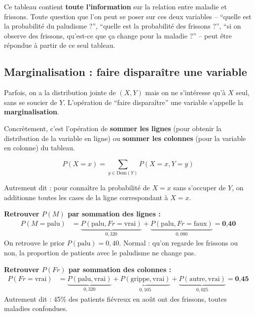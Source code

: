 \documentclass[11pt,a4paper]{article}
\begin{document}
Ce tableau contient \textbf{toute l'information} sur la relation entre maladie et frissons. Toute question que l'on peut se poser sur ces deux variables -- ``quelle est la probabilité du paludisme ?'', ``quelle est la probabilité des frissons ?'', ``si on observe des frissons, qu'est-ce que ça change pour la maladie ?'' -- peut être répondue à partir de ce seul tableau.

\subsection{Marginalisation : faire disparaître une variable}

Parfois, on a la distribution jointe de $(X, Y)$ mais on ne s'intéresse qu'à $X$ seul, sans se soucier de $Y$. L'opération de ``faire disparaître'' une variable s'appelle la \textbf{marginalisation}.

Concrètement, c'est l'opération de \textbf{sommer les lignes} (pour obtenir la distribution de la variable en ligne) ou \textbf{sommer les colonnes} (pour la variable en colonne) du tableau.

\begin{definitionbox}
$$P(X = x) = \sum_{y \in \text{Dom}(Y)} P(X = x, Y = y)$$

Autrement dit  : pour connaître la probabilité de $X = x$ sans s'occuper de $Y$, on additionne toutes les cases de la ligne correspondant à $X = x$.
\end{definitionbox}

\begin{exemplebox}
\textbf{Retrouver $P(M)$ par sommation des lignes :}
\begin{align*}
P(M = \text{palu}) &= \underbrace{P(\text{palu}, Fr = \text{vrai})}_{0{,}320} + \underbrace{P(\text{palu}, Fr = \text{faux})}_{0{,}080} = \textbf{0,40}
\end{align*}
On retrouve le prior $P(\text{palu}) = 0{,}40$. Normal : qu'on regarde les frissons ou non, la proportion de patients avec le paludisme ne change pas.

\textbf{Retrouver $P(Fr)$ par sommation des colonnes :}
\begin{align*}
P(Fr = \text{vrai}) &= \underbrace{P(\text{palu}, \text{vrai})}_{0{,}320} + \underbrace{P(\text{grippe}, \text{vrai})}_{0{,}105} + \underbrace{P(\text{autre}, \text{vrai})}_{0{,}025} = \textbf{0,45}
\end{align*}
Autrement dit  : 45\% des patients fiévreux en août ont des frissons, toutes maladies confondues.
\end{exemplebox}
\end{document}
